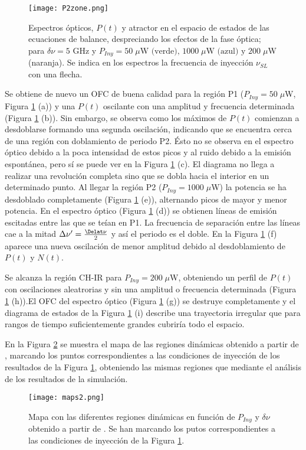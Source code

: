 			\begin{figure}[H]
				\centering
				\texttt{[image: P2zone.png]}
				\caption{\label{fig:P2zone}Espectros \'opticos, $P(t)$ y atractor en el espacio de estados de las ecuaciones de balance, despreciando los efectos de la fase \'optica; para $\delta\nu = 5$ GHz y $P_{Iny} = 50\;\mu \textrm{W (verde), } 1000\;\mu\textrm{W (azul) y } 200\;\mu$W (naranja). Se indica en los espectros la frecuencia de inyecci\'on $\nu_{SL}$ con una flecha.}	
			\end{figure}

			Se obtiene de nuevo un OFC de buena calidad para la regi\'on P1 ($P_{Iny} = 50\;\mu$W, Figura \ref{fig:P2zone} (a)) y una $P(t)$ oscilante con una amplitud y frecuencia determinada (Figura \ref{fig:P2zone} (b)). Sin embargo, se observa como los m\'aximos de $P(t)$ comienzan a desdoblarse formando una segunda oscilaci\'on, indicando que se encuentra cerca de una regi\'on con doblamiento de periodo P2. \'Esto no se observa en el espectro \'optico debido a la poca intensidad de estos picos y al ruido debido a la emisi\'on espont\'anea, pero s\'i se puede ver en la Figura \ref{fig:P2zone} (c). El diagrama no llega a realizar una revoluci\'on completa sino que se dobla hacia el interior en un determinado punto. Al llegar la regi\'on P2 ($P_{Iny} = 1000\;\mu$W) la potencia se ha desdoblado completamente (Figura \ref{fig:P2zone} (e)), alternando picos de mayor y menor potencia. En el espectro \'optico (Figura \ref{fig:P2zone} (d)) se obtienen l\'ineas de emisi\'on escitadas entre las que se te\'ian en P1. La frecuencia de separaci\'on entre las l\'ineas cae a la mitad $\Delta \nu' = \frac{\Delat\nu}{2}$ y as\'i el periodo es el doble. En la Figura \ref{fig:P2zone} (f) aparece una nueva oscilaci\'on de menor amplitud debido al desdoblamiento de $P(t)$ y $N(t)$.

		Se alcanza la regi\'on CH-IR para $P_{Iny} = 200\;\mu$W, obteniendo un perfil de $P(t)$ con oscilaciones aleatrorias y sin una amplitud o frecuencia determinada (Figura \ref{fig:P2zone} (h)).El OFC del espectro \'optico (Figura \ref{fig:P2zone} (g)) se destruye completamente y el diagrama de estados de la Figura \ref{fig:P2zone} (i) describe una trayectoria irregular que para rangos de tiempo suficientemente grandes cubrir\'ia todo el espacio. 

		En la Figura \ref{fig:maps2} se muestra el mapa de las regiones din\'amicas obtenido a partir de \cite{Chaves19}, marcando los puntos correspondientes a las condiciones de inyecci\'on de los resultados de la Figura \ref{fig:P2zone}, obteniendo las mismas regiones que mediante el an\'alisis de los resultados de la simulaci\'on.

			\begin{figure}[H]
				\centering
				\texttt{[image: maps2.png]}
				\caption{\label{fig:maps2}Mapa con las diferentes regiones din\'amicas en funci\'on de $P_{Iny}$ y $\delta\nu$ obtenido a partir de \cite{Chaves19}. Se han marcando los putos correspondientes a las condiciones de inyecci\'on de la Figura \ref{fig:P2zone}.}	
			\end{figure}
